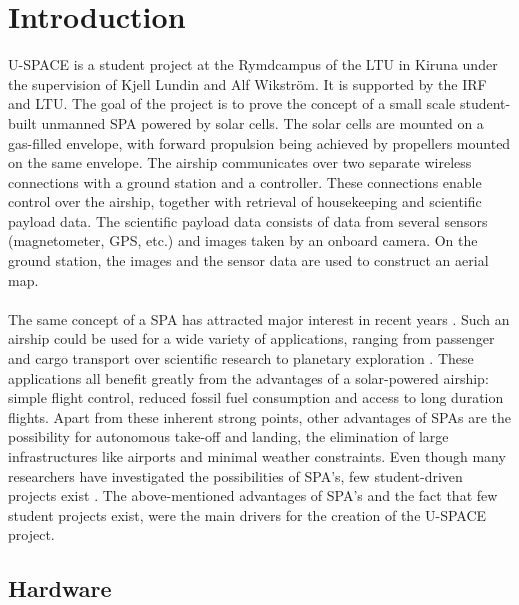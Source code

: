 \newpage
\chapter{Introduction}
\label{chap:introduction}

\ac{U-SPACE} is a student project at the Rymdcampus of the \ac{LTU} in Kiruna under the supervision of Kjell Lundin and Alf Wikström. It is supported by the \ac{IRF} and \ac{LTU}. The goal of the project is to prove the concept of a small scale student-built unmanned \ac{SPA} powered by solar cells. The solar cells are mounted on a gas-filled envelope, with forward propulsion being achieved by propellers mounted on the same envelope. The airship communicates over two separate wireless connections with a ground station and a controller. These connections enable control over the airship, together with retrieval of housekeeping and scientific payload data. The scientific payload data consists of data from several sensors (magnetometer, GPS, etc.) and images taken by an onboard camera. On the ground station, the images and the sensor data are used to construct an aerial map.
\\
\\
The same concept of a \ac{SPA} has attracted major interest in recent years \cite{website:ravenaerostar, website:gaya, poster:saba, report:colozza2004}. Such an airship could be used for a wide variety of applications, ranging from passenger and cargo transport \cite{website:gaya} over scientific research \cite{poster:saba} to planetary exploration \cite{report:colozza2004}. These applications all benefit greatly from the advantages of a solar-powered airship: simple flight control, reduced fossil fuel consumption and access to long duration flights. Apart from these inherent strong points, other advantages of \ac{SPA}s are the possibility for autonomous take-off and landing, the elimination of large infrastructures like airports and minimal weather constraints. Even though many researchers have investigated the possibilities of \ac{SPA}'s, few student-driven projects exist \cite{website:solr}. The above-mentioned advantages of \ac{SPA}'s and the fact that few student projects exist, were the main drivers for the creation of the \ac{U-SPACE} project. %

\section{Hardware}
\label{sec:intro_hardware}

